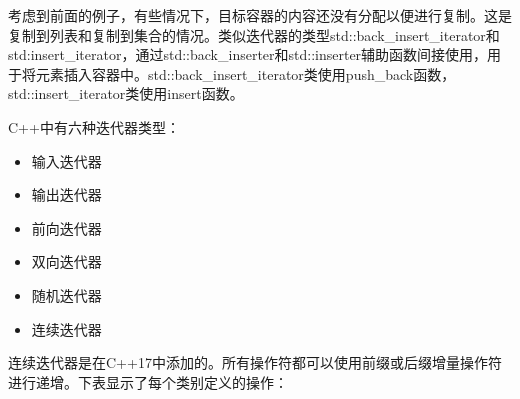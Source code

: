 考虑到前面的例子，有些情况下，目标容器的内容还没有分配以便进行复制。这是复制到列表和复制到集合的情况。类似迭代器的类型std::back\_insert\_iterator和std:insert\_iterator，通过std::back\_inserter和std::inserter辅助函数间接使用，用于将元素插入容器中。std::back\_insert\_iterator类使用push\_back函数，std::insert\_iterator类使用insert函数。

C++中有六种迭代器类型：

\begin{itemize}
\item
输入迭代器

\item
输出迭代器

\item
前向迭代器

\item
双向迭代器

\item
随机迭代器

\item
连续迭代器
\end{itemize}

连续迭代器是在C++17中添加的。所有操作符都可以使用前缀或后缀增量操作符进行递增。下表显示了每个类别定义的操作：

